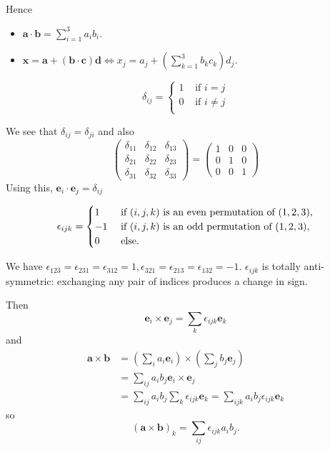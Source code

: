 \documentclass[10pt]{article}
\begin{document}
    Hence
    \begin{itemize}
        \item $\displaystyle \mathbf{a}\cdot \mathbf{b} = \sum_{i=1}^{3}a_ib_i$.
        \item $\displaystyle \mathbf{x}=\mathbf{a}+(\mathbf{b}\cdot \mathbf{c})\mathbf{d} \Leftrightarrow x_j=a_j+\left( \sum_{k=1}^{3} b_kc_k \right)d_j $. 
    \end{itemize}
    \begin{definition}
        \[
            \delta_{ij} = \begin{cases}
            1 &\text{ if }i=j\\
            0 &\text{ if }i\neq j\\
            \end{cases}
        \] 
    \end{definition}
    We see that $ \delta_{ij}=\delta_{ji} $ and also 
    \[
        \left(\begin{array}{lll}
            \delta_{11} & \delta_{12} & \delta_{13} \\
            \delta_{21} & \delta_{22} & \delta_{23} \\
            \delta_{31} & \delta_{32} & \delta_{33}
            \end{array}\right)=\left(\begin{array}{lll}
            1 & 0 & 0 \\
            0 & 1 & 0 \\
            0 & 0 & 1
            \end{array}\right)
    \]
    Using this, $ \mathbf{e}_i\cdot \mathbf{e}_j=\delta_{ij} $
    \begin{definition}
        \[
            \epsilon_{ijk}=\begin{cases}
            1 &\text{ if $ (i,j,k) $ is an even permutation of $ (1,2,3) $,}\\
            -1 &\text{ if $ (i,j,k) $ is an odd permutation of $ (1,2,3) $,}\\
            0 &\text{ else.}\\
            \end{cases} 
        \]
    \end{definition}
    We have $ \epsilon_{123}=\epsilon_{231}=\epsilon_{312}=1, \epsilon_{321}=\epsilon_{213}=\epsilon_{132}=-1 $.
    $ \epsilon_{ijk} $ is totally anti-symmetric: exchanging any pair of indices produces a change in sign.

    Then 
    \[
        \mathbf{e}_i \times \mathbf{e}_j = \sum_{k}\epsilon_{ijk}\mathbf{e}_k
    \]
    and 
    \[
        \begin{aligned}
            \mathbf{a} \times \mathbf{b}&= \left( \sum_{i} a_i \mathbf{e}_i \right)\times \left( \sum_{j} b_j \mathbf{e}_j \right)\\
            &= \sum_{ij}a_ib_j \mathbf{e}_i \times \mathbf{e}_j\\
            &= \sum_{ij}a_ib_j\sum_{k}\epsilon_{ijk}\mathbf{e}_k=\sum_{ijk}a_ib_j\epsilon_{ijk}\mathbf{e}_k
        \end{aligned}
    \]
    so 
    \[
        \boxed{(\mathbf{a}\times \mathbf{b})_k=\sum_{ij}\epsilon_{ijk}a_ib_j}
    .\]
\end{document}
